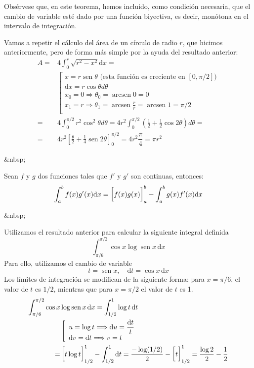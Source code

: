 Obsérvese que, en este teorema, hemos incluido, como condición necesaria, que el cambio de variable esté dado por una función biyectiva, es decir, monótona en el intervalo de integración.
%
\begin{ejemplo}
Vamos a repetir el cálculo del área de un círculo de radio $r$, que hicimos anteriormente, pero de forma más simple por la ayuda del resultado anterior:
\begin{align*}
A =& 4\int_0^r\sqrt{r^2-x^2}\mathrm dx=\\
&\left[
\begin{array}{l}
x=r\operatorname{sen}\theta \text{ (esta función es creciente en $[0,\pi/2]$)}\\
\mathrm dx=r\cos\theta d\theta\\
x_0=0 \Rightarrow \theta_0=\operatorname{arcsen} 0 = 0\\
x_1=r \Rightarrow \theta_1=\operatorname{arcsen}\frac{r}r =\operatorname{arcsen}1 = \pi/2\\
\end{array}
\right.\\
= & 4\int_0^{\pi/2}r^2\cos^2\theta d\theta
= 4r^2\int_0^{\pi/2}\left(\frac12+\frac12\cos2\theta\right) d\theta=\\
= & 4r^2\left[\frac{\theta}2+\frac14\operatorname{sen} 2\theta\right]_0^{\pi/2}
= 4r^2 \dfrac{\pi}4 = \pi r^2\tag*{\fej}
\end{align*}
\end{ejemplo}
\begin{rawhtml}
&nbsp;
\end{rawhtml}
\begin{teorema}\label{th:partes}
Sean $f$ y $g$ dos funciones tales que $f'$ y $g'$ son  continuas, entonces:
\[
\int_a^bf(x)g'(x)\mathrm dx = \left[f(x)g(x)\vphantom{\frac12}\right]_a^b-\int_a^bg(x)f'(x)\mathrm dx
\]
\end{teorema}
\begin{rawhtml}
&nbsp;
\end{rawhtml}
\begin{ejemplo}
Utilizamos el resultado anterior para calcular la siguiente integral definida
\[
\int_{\pi/6}^{\pi/2}\cos x \log\operatorname{sen} x\,\mathrm dx
\]
Para ello, utilizamos el cambio de variable
\[
t = \operatorname{sen} x,\quad
\mathrm dt = \cos x\,\mathrm dx
\]
Los límites de integración se modifican de la siguiente forma: para $x=\pi/6$, el valor de $t$ es  $1/2$, mientras que para $x=\pi/2$ el valor de $t$ es 1.
%
\begin{align*}
\int_{\pi/6}^{\pi/2}\cos x & \log\operatorname{sen} x\,\mathrm dx =\int_{1/2}^{1} \log t\,\mathrm dt \\
& \left[
\begin{array}{l}
u= \log t \Longrightarrow \mathrm du=\dfrac{\mathrm dt}t \\
\mathrm dv =\mathrm dt \Longrightarrow v=t
\end{array}
\right.\\
= & \left[t\log t\vphantom{\dfrac12}\right]_{1/2}^{1} - \int_{1/2}^{1}\mathrm dt 
= \dfrac{-\log(1/2)}2-\left[t\vphantom{\dfrac12}\right]_{1/2}^{1} = \dfrac{\log 2}2-\dfrac12
\end{align*}
\end{ejemplo}

